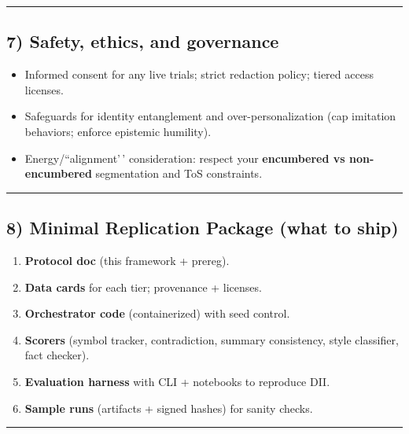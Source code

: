 \documentclass{article}
\begin{document}
\begin{center}\rule{0.5\linewidth}{0.5pt}\end{center}

\subsection*{7) Safety, ethics, and governance}\label{safety-ethics-and-governance}

\begin{itemize}
\item
  Informed consent for any live trials; strict redaction policy; tiered access licenses.
\item
  Safeguards for identity entanglement and over-personalization (cap imitation behaviors; enforce epistemic humility).
\item
  Energy/``alignment'\,' consideration: respect your \textbf{encumbered vs non-encumbered} segmentation and ToS constraints.
\end{itemize}

\begin{center}\rule{0.5\linewidth}{0.5pt}\end{center}

\subsection*{8) Minimal Replication Package (what to ship)}\label{minimal-replication-package-what-to-ship}

\begin{enumerate}
\def\labelenumi{\arabic{enumi}.}
\item
  \textbf{Protocol doc} (this framework + prereg).
\item
  \textbf{Data cards} for each tier; provenance + licenses.
\item
  \textbf{Orchestrator code} (containerized) with seed control.
\item
  \textbf{Scorers} (symbol tracker, contradiction, summary consistency, style classifier, fact checker).
\item
  \textbf{Evaluation harness} with CLI + notebooks to reproduce DII.
\item
  \textbf{Sample runs} (artifacts + signed hashes) for sanity checks.
\end{enumerate}

\begin{center}\rule{0.5\linewidth}{0.5pt}\end{center}
\end{document}
